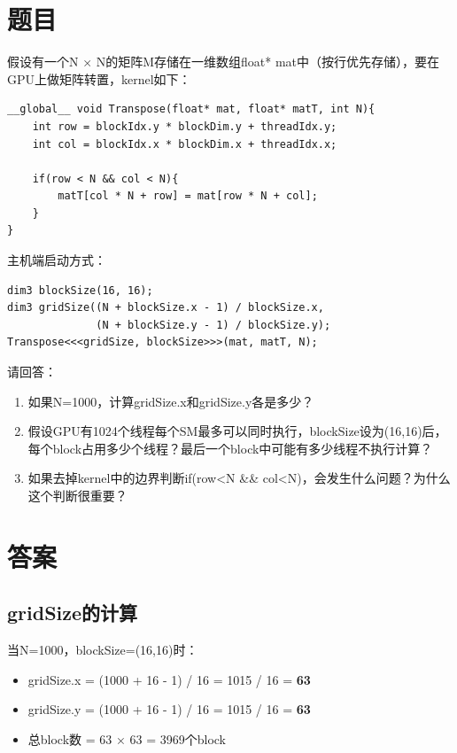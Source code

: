 \section{题目}

假设有一个N × N的矩阵M存储在一维数组float* mat中（按行优先存储），要在GPU上做矩阵转置，kernel如下：

\begin{lstlisting}[style=cleancpp]
__global__ void Transpose(float* mat, float* matT, int N){
    int row = blockIdx.y * blockDim.y + threadIdx.y;
    int col = blockIdx.x * blockDim.x + threadIdx.x;
    
    if(row < N && col < N){
        matT[col * N + row] = mat[row * N + col];
    }
}
\end{lstlisting}

主机端启动方式：
\begin{lstlisting}[style=cleancpp]
dim3 blockSize(16, 16);
dim3 gridSize((N + blockSize.x - 1) / blockSize.x, 
              (N + blockSize.y - 1) / blockSize.y);
Transpose<<<gridSize, blockSize>>>(mat, matT, N);
\end{lstlisting}

请回答：
\begin{enumerate}
    \item 如果N=1000，计算gridSize.x和gridSize.y各是多少？
    \item 假设GPU有1024个线程每个SM最多可以同时执行，blockSize设为(16,16)后，每个block占用多少个线程？最后一个block中可能有多少线程不执行计算？
    \item 如果去掉kernel中的边界判断if(row<N \&\& col<N)，会发生什么问题？为什么这个判断很重要？
\end{enumerate}

\section{答案}
\subsection{gridSize的计算}

当N=1000，blockSize=(16,16)时：

\begin{itemize}
    \item gridSize.x = (1000 + 16 - 1) / 16 = 1015 / 16 = \textbf{63}
    \item gridSize.y = (1000 + 16 - 1) / 16 = 1015 / 16 = \textbf{63}
    \item 总block数 = 63 × 63 = 3969个block
\end{itemize}

